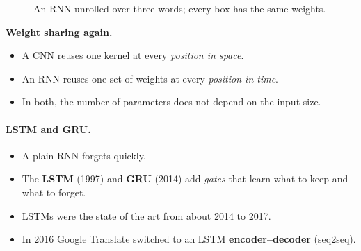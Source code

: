 \documentclass[12pt, a4paper]{article}
\providecommand{\bh}{\mathbf{h}}
\begin{document}
\begin{figure}[H]
  \centering
  \caption{An RNN unrolled over three words; every box has the same weights.}
  \label{fig:rnn}
\end{figure}

\begin{patternbox}
  \textbf{Weight sharing again.}
  \begin{itemize}
    \item A CNN reuses one kernel at every \emph{position in space}.
    \item An RNN reuses one set of weights at every \emph{position in time}.
    \item In both, the number of parameters does not depend on the input
          size.
  \end{itemize}
\end{patternbox}

\paragraph{LSTM and GRU.}
\begin{itemize}
  \item A plain RNN forgets quickly.
  \item The \textbf{LSTM} (1997) and \textbf{GRU} (2014) add \emph{gates}
        that learn what to keep and what to forget.
  \item LSTMs were the state of the art from about 2014 to 2017.
  \item In 2016 Google Translate switched to an LSTM
        \textbf{encoder--decoder} (seq2seq).
\end{itemize}
\end{document}
